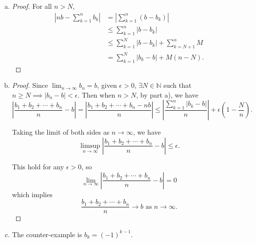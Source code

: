 \begin{Exercise}
\begin{enumerate}[a)]
\item
\begin{proof}
For all $n>N$,
\begin{align*}
\left|n b-\sum_{k=1}^{n}b_k\right| 
&= \left|\sum_{k=1}^{n}(b-b_k)\right| \\
&\leq  \sum_{k=1}^{n}|b-b_k| \\
&\leq \sum_{k=1}^{N} |b-b_k| + \sum_{k=N+1}^{n}M \\
&= \sum_{k=1}^{N}|b_k-b| + M(n-N).
\end{align*}
\end{proof}

\item
\begin{proof}
Since $\lim_{n\to\infty} b_n = b$, given $\epsilon>0$, $\exists N\in\mathbb{N}$ such that $n \geq N \implies |b_n-b| < \epsilon$.
Then when $n > N$, by part a), we have 
$$
\left|\frac{b_1+b_2+\cdots+b_n}{n}-b\right| 
= \left|\frac{b_1+b_2+\cdots+b_n-n b}{n}\right| 
\leq \left|\frac{\sum_{k=1}^{n}\left|b_k-b\right|}{n}\right|+\epsilon\left(1-\frac{N}{n}\right).
$$

Taking the limit of both sides as $n\to\infty$, we have 
$$
\limsup_{n\to\infty}\left|\frac{b_1+b_2+\cdots+b_n}{n}-b\right| 
\leq \epsilon.
$$

This hold for any $\epsilon > 0$, so 
$$
\lim_{n\to\infty}\left|\frac{b_1+b_2+\cdots+b_n}{n}-b\right| = 0 
$$
which implies 
$$
\frac{b_1+b_2+\cdots+b_n}{n}\to b \text{ as } n\to\infty.
$$
\end{proof}

\item
\begin{solution}
The counter-example is $b_k=(-1)^{k-1}$.
\end{solution}
\end{enumerate}
\end{Exercise}